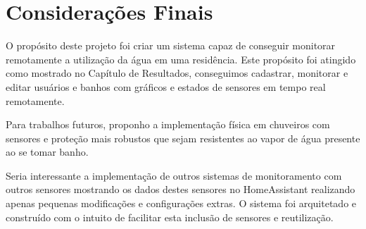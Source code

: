 \chapter{Considerações Finais}

O propósito deste projeto foi criar um sistema capaz de conseguir monitorar remotamente a utilização da água em uma residência. Este propósito foi atingido como mostrado no Capítulo de Resultados, conseguimos cadastrar, monitorar e editar usuários e banhos com gráficos e estados de sensores em tempo real remotamente.

Para trabalhos futuros, proponho a implementação física em chuveiros com sensores e proteção mais robustos que sejam resistentes ao vapor de água presente ao se tomar banho. 

Seria interessante a implementação de outros sistemas de monitoramento com outros sensores mostrando os dados destes sensores no HomeAssistant realizando apenas pequenas modificações e configurações extras. O sistema foi arquitetado e construído com o intuito de facilitar esta inclusão de sensores e reutilização.